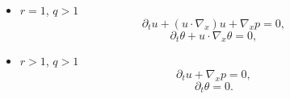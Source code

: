 \begin{theorem}
\begin{itemize}
\item $ r=1$, $q>1$ \begin{equation} \partial_t u+   (u\cdot \nabla_x) u +\nabla_x p= 0,\label{eq:incU12}\end{equation}
\begin{equation} 
 \partial_t \theta +  u\cdot \nabla_x\theta=0,\label{eq:incTH12}
\end{equation}
\item $r>1$, $q>1$ \begin{equation}
 \partial_t u+\nabla_x p= 0,\label{eq:incU22} \end{equation}
\begin{equation}
\partial_t \theta = 0.\label{eq:incTH22}
 \end{equation} 

\end{itemize}
 

\end{theorem}
